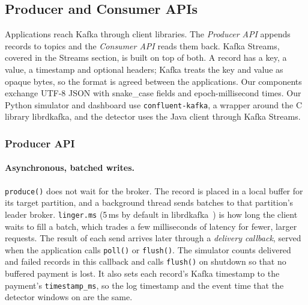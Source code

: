 
\subsection{Producer and Consumer APIs}
\label{sec:clients}

Applications reach Kafka through client libraries. The \emph{Producer API} appends records to topics and the \emph{Consumer API} reads them back. Kafka Streams, covered in the Streams section, is built on top of both. A record has a key, a value, a timestamp and optional headers; Kafka treats the key and value as opaque bytes, so the format is agreed between the applications. Our components exchange UTF-8 JSON with snake\_case fields and epoch-millisecond times. Our Python simulator and dashboard use \texttt{confluent-kafka}, a wrapper around the C library librdkafka, and the detector uses the Java client through Kafka Streams.

\subsubsection{Producer API}

\paragraph{Asynchronous, batched writes.}
\texttt{produce()} does not wait for the broker. The record is placed in a local buffer for its target partition, and a background thread sends batches to that partition's leader broker. \texttt{linger.ms} (5\,ms by default in librdkafka~\cite{librdkafka-config}) is how long the client waits to fill a batch, which trades a few milliseconds of latency for fewer, larger requests. The result of each send arrives later through a \emph{delivery callback}, served when the application calls \texttt{poll()} or \texttt{flush()}. The simulator counts delivered and failed records in this callback and calls \texttt{flush()} on shutdown so that no buffered payment is lost. It also sets each record's Kafka timestamp to the payment's \texttt{timestamp\_ms}, so the log timestamp and the event time that the detector windows on are the same.

